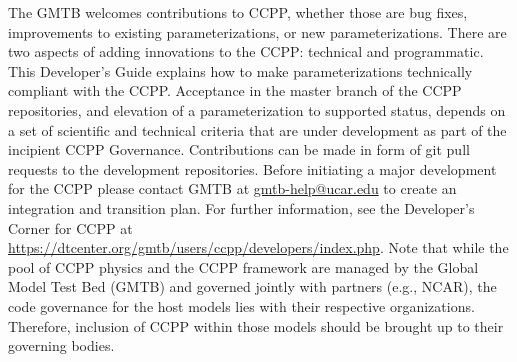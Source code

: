 The GMTB welcomes contributions to CCPP, whether those are bug fixes, improvements to existing parameterizations, or new parameterizations. There are two aspects of adding innovations to the CCPP: technical and programmatic. This Developer's Guide explains how to make parameterizations technically compliant with the CCPP. Acceptance in the master branch of the CCPP repositories, and elevation of a parameterization to supported status, depends on a set of scientific and technical criteria that are under development as part of the incipient CCPP Governance. Contributions can be made in form of git pull requests to the development repositories. Before initiating a major development for the CCPP please contact GMTB at \url{gmtb-help@ucar.edu} to create an integration and transition plan. For further information, see the Developer's Corner for CCPP at \url{https://dtcenter.org/gmtb/users/ccpp/developers/index.php}. Note that while the pool of CCPP physics and the CCPP framework are managed by the Global Model Test Bed (GMTB) and governed jointly with partners (e.g., NCAR), the code governance for the host models lies with their respective organizations. Therefore, inclusion of CCPP within those models should be brought up to their governing bodies.